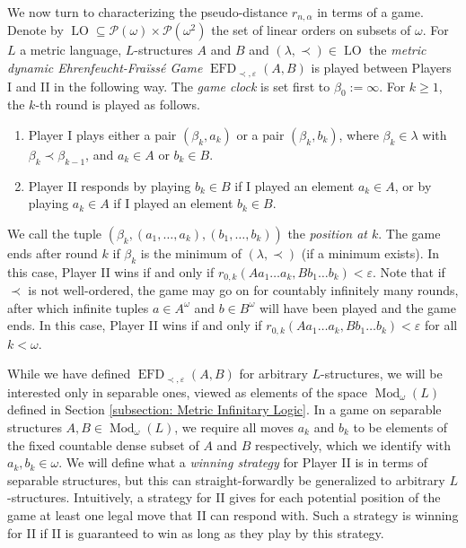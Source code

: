 \documentclass[12pt]{amsart}
\DeclareMathOperator{\EFD}{EFD}
\DeclareMathOperator{\Mod}{Mod}
\DeclareMathOperator{\LO}{LO}
\begin{document}
We now turn to characterizing the pseudo-distance $r_{n,\alpha}$ in terms of a game.
Denote by $\LO\subseteq\mathcal{P}(\omega)\times\mathcal{P}(\omega^2)$ the set of linear orders on subsets of $\omega$.
For $L$ a metric language, $L$-structures $A$ and $B$ and $(\lambda,\prec)\in\LO$ the \emph{metric dynamic Ehrenfeucht-Fra\"iss\'e Game} $\EFD_{\prec,\varepsilon}(A,B)$ is played between Players I and II in the following way. The \textit{game clock} is set first to $\beta_0:=\infty$. For $k\geq 1$, the $k$-th round is played as follows.
\begin{enumerate}
    \item Player I plays either a pair $(\beta_k,a_k)$ or a pair $(\beta_k,b_k)$, where $\beta_k\in\lambda$ with $\beta_k\prec\beta_{k-1}$, and $a_k\in A$ or $b_k\in B$.
    \item Player II responds by playing $b_k\in B$ if I played an element $a_k\in A$, or by playing $a_k\in A$ if I played an element $b_k\in B$.
\end{enumerate}
We call the tuple $(\beta_k,(a_1,\dots,a_k),(b_1,\dots,b_k))$ the \textit{position at $k$}. The game ends after round $k$ if $\beta_k$ is the minimum of $(\lambda,\prec)$ (if a minimum exists). 
In this case, Player II wins if and only if $r_{0,k}(Aa_1\dots a_k,Bb_1\dots b_k)<\varepsilon$. Note that if $\prec$ is not well-ordered, the game may go on for countably infinitely many rounds, after which infinite tuples $a\in A^\omega$ and $b\in B^\omega$ will have been played and the game ends. In this case, Player II wins if and only if $r_{0,k}(Aa_1\dots a_k,Bb_1\dots b_k)<\varepsilon$ for all $k<\omega$.  

While we have defined $\EFD_{\prec,\varepsilon}(A,B)$ for arbitrary $L$-structures, we will be interested only in separable ones, viewed as elements of the space $\Mod_\omega(L)$ defined in Section \ref{subsection: Metric Infinitary Logic}. In a game on separable structures $A,B\in\Mod_\omega(L)$, we require all moves $a_k$ and $b_k$ to be elements of the fixed countable dense subset of $A$ and $B$ respectively, which we identify with $a_k,b_k\in\omega$. We will define what a \textit{winning strategy} for Player II is in terms of separable structures, but this can straight-forwardly be generalized to arbitrary $L$-structures. 
Intuitively, a strategy for II gives for each potential position of the game at least one legal move that II can respond with. Such a strategy is winning for II if II is guaranteed to win as long as they play by this strategy. 
\end{document}
